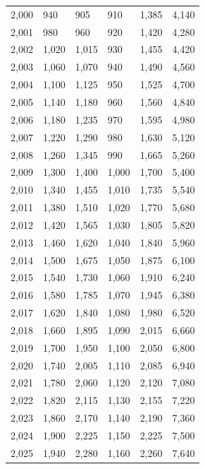 \documentclass{sener2025}
\begin{document}
\begin{tabladoradoLargo}
\begin{longtable}{B{3cm}p{2.20cm}p{2.20cm}p{2.20cm}p{2.20cm}p{2.20cm}}
    2,000 & 940 & 905 & 910 & 1,385 & 4,140 \\
    2,001 & 980 & 960 & 920 & 1,420 & 4,280 \\
    2,002 & 1,020 & 1,015 & 930 & 1,455 & 4,420 \\
    2,003 & 1,060 & 1,070 & 940 & 1,490 & 4,560 \\
    2,004 & 1,100 & 1,125 & 950 & 1,525 & 4,700 \\
    2,005 & 1,140 & 1,180 & 960 & 1,560 & 4,840 \\
    2,006 & 1,180 & 1,235 & 970 & 1,595 & 4,980 \\
    2,007 & 1,220 & 1,290 & 980 & 1,630 & 5,120 \\
    2,008 & 1,260 & 1,345 & 990 & 1,665 & 5,260 \\
    2,009 & 1,300 & 1,400 & 1,000 & 1,700 & 5,400 \\
    2,010 & 1,340 & 1,455 & 1,010 & 1,735 & 5,540 \\
    2,011 & 1,380 & 1,510 & 1,020 & 1,770 & 5,680 \\
    2,012 & 1,420 & 1,565 & 1,030 & 1,805 & 5,820 \\
    2,013 & 1,460 & 1,620 & 1,040 & 1,840 & 5,960 \\
    2,014 & 1,500 & 1,675 & 1,050 & 1,875 & 6,100 \\
    2,015 & 1,540 & 1,730 & 1,060 & 1,910 & 6,240 \\
    2,016 & 1,580 & 1,785 & 1,070 & 1,945 & 6,380 \\
    2,017 & 1,620 & 1,840 & 1,080 & 1,980 & 6,520 \\
    2,018 & 1,660 & 1,895 & 1,090 & 2,015 & 6,660 \\
    2,019 & 1,700 & 1,950 & 1,100 & 2,050 & 6,800 \\
    2,020 & 1,740 & 2,005 & 1,110 & 2,085 & 6,940 \\
    2,021 & 1,780 & 2,060 & 1,120 & 2,120 & 7,080 \\
    2,022 & 1,820 & 2,115 & 1,130 & 2,155 & 7,220 \\
    2,023 & 1,860 & 2,170 & 1,140 & 2,190 & 7,360 \\
    2,024 & 1,900 & 2,225 & 1,150 & 2,225 & 7,500 \\
    2,025 & 1,940 & 2,280 & 1,160 & 2,260 & 7,640 \\
  \end{longtable}
\end{tabladoradoLargo}
\vspace{-4pt}
\end{document}

